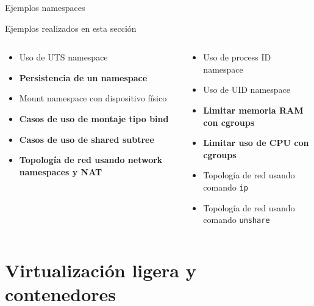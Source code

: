 \documentclass[aspectratio=169,xcolor=dvipsnames]{beamer}
\begin{document}
	\begin{frame}{Ejemplos namespaces}
	    \begin{alertblock}{Ejemplos realizados en esta sección}
	        \begin{columns}
	        \begin{column}{0.5\textwidth}
	            \begin{itemize}
	                \item Uso de UTS namespace
	                \item \textbf{Persistencia de un namespace}
	                \item Mount namespace con dispositivo físico
	                \item \textbf{Casos de uso de montaje tipo bind}
	                \item \textbf{Casos de uso de shared subtree}
	                \item \textbf{Topología de red usando network namespaces y NAT}
	            \end{itemize}
	        \end{column}
	        
	        \begin{column}{0.5\textwidth}
	            \begin{itemize}
	                \item Uso de process ID namespace
	                \item Uso de UID namespace
	                \item \textbf{Limitar memoria RAM con cgroups}
	                \item \textbf{Limitar uso de CPU con cgroups}
	                \item Topología de red usando comando \texttt{ip}
	                \item Topología de red usando comando \texttt{unshare}
	            \end{itemize}
	        \end{column}
	    \end{columns}
	    \end{alertblock}
	\end{frame}
	
	
	\section{Virtualización ligera y contenedores}
	
\end{document}
